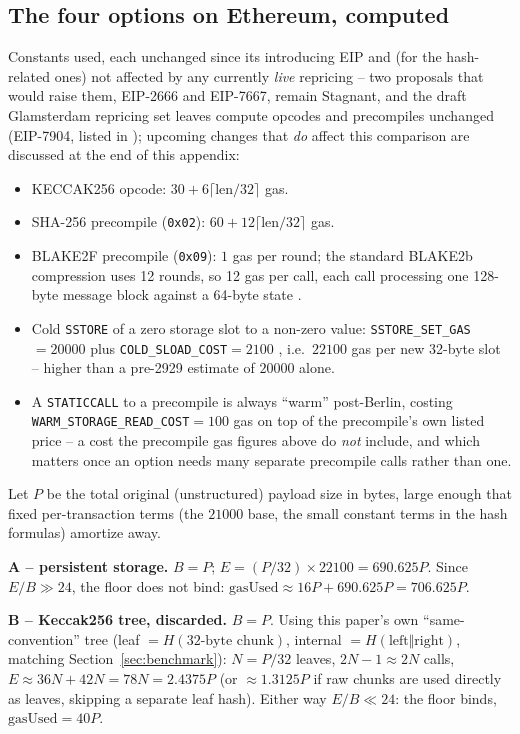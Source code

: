 \subsection{The four options on Ethereum, computed}
\label{sec:rollup-eth-numbers}

Constants used, each unchanged since its introducing EIP and (for the
hash-related ones) not affected by any currently \emph{live} repricing --
two proposals that would raise them, EIP-2666 and EIP-7667, remain
Stagnant, and the draft Glamsterdam repricing set leaves compute opcodes and
precompiles unchanged (EIP-7904, listed in \citep{eip8007}); upcoming
changes that \emph{do} affect this comparison are discussed at the end of
this appendix:
\begin{itemize}
\item KECCAK256 opcode: $30 + 6\lceil \mathrm{len}/32\rceil$ gas.
\item SHA-256 precompile (\texttt{0x02}): $60 + 12\lceil
  \mathrm{len}/32\rceil$ gas.
\item BLAKE2F precompile (\texttt{0x09}): $1$ gas per round; the standard
  BLAKE2b compression uses 12 rounds, so 12 gas per call, each call
  processing one 128-byte message block against a 64-byte state
  \citep{eip152}.
\item Cold \texttt{SSTORE} of a zero storage slot to a non-zero value:
  \texttt{SSTORE\_SET\_GAS}$=20000$ \citep{eip2200} plus
  \texttt{COLD\_SLOAD\_COST}$=2100$ \citep{eip2929}, i.e.\ $22100$ gas per
  new 32-byte slot -- higher than a pre-2929 estimate of $20000$ alone.
\item A \texttt{STATICCALL} to a precompile is always ``warm'' post-Berlin,
  costing \texttt{WARM\_STORAGE\_READ\_COST}$=100$ gas
  \citep{eip2929} on top of the precompile's own listed price -- a cost the
  precompile gas figures above do \emph{not} include, and which matters
  once an option needs many separate precompile calls rather than one.
\end{itemize}

Let $P$ be the total original (unstructured) payload size in bytes, large
enough that fixed per-transaction terms (the $21000$ base, the small
constant terms in the hash formulas) amortize away.

\textbf{A -- persistent storage.} $B=P$; $E = (P/32)\times 22100 =
690.625P$. Since $E/B \gg 24$, the floor does not bind:
$\mathrm{gasUsed} \approx 16P + 690.625P = 706.625P$.

\textbf{B -- Keccak256 tree, discarded.} $B=P$. Using this paper's own
``same-convention'' tree (leaf $=H(\text{32-byte chunk})$, internal
$=H(\text{left}\Vert\text{right})$, matching Section~\ref{sec:benchmark}):
$N=P/32$ leaves, $2N-1\approx 2N$ calls, $E \approx 36N + 42N = 78N =
2.4375P$ (or $\approx 1.3125P$ if raw chunks are used directly as leaves,
skipping a separate leaf hash). Either way $E/B \ll 24$: the floor binds,
$\mathrm{gasUsed} = 40P$.

